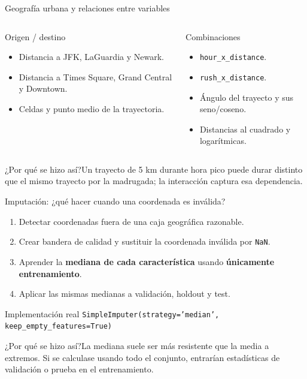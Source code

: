 \documentclass[aspectratio=169,11pt]{beamer}
\newcommand{\porq}[1]{\vspace{1.2mm}\begin{block}{¿Por qué se hizo así?}\small #1\end{block}}
\begin{document}
\begin{frame}{Geografía urbana y relaciones entre variables}
\begin{columns}[T]
\begin{block}{Origen / destino}
\begin{itemize}
\item Distancia a JFK, LaGuardia y Newark.
\item Distancia a Times Square, Grand Central y Downtown.
\item Celdas y punto medio de la trayectoria.
\end{itemize}
\end{block}
\begin{block}{Combinaciones}
\begin{itemize}
\item \texttt{hour\_x\_distance}.
\item \texttt{rush\_x\_distance}.
\item Ángulo del trayecto y sus seno/coseno.
\item Distancias al cuadrado y logarítmicas.
\end{itemize}
\end{block}
\end{columns}
\porq{Un trayecto de 5 km durante hora pico puede durar distinto que el mismo trayecto por la madrugada; la interacción captura esa dependencia.}
\end{frame}

\begin{frame}{Imputación: ¿qué hacer cuando una coordenada es inválida?}
\begin{enumerate}
\item Detectar coordenadas fuera de una caja geográfica razonable.
\item Crear bandera de calidad y sustituir la coordenada inválida por \texttt{NaN}.
\item Aprender la \textbf{mediana de cada característica} usando \textbf{únicamente entrenamiento}.
\item Aplicar las mismas medianas a validación, holdout y test.
\end{enumerate}
\begin{block}{Implementación real}
\texttt{SimpleImputer(strategy='median', keep\_empty\_features=True)}
\end{block}
\porq{La mediana suele ser más resistente que la media a extremos. Si se calculase usando todo el conjunto, entrarían estadísticas de validación o prueba en el entrenamiento.}
\end{frame}
\end{document}
